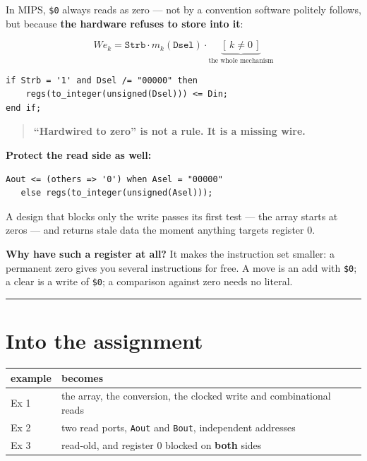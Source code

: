 \documentclass[11pt]{article}
\newcommand{\code}[1]{\texttt{#1}}
\newcommand{\hr}{\vspace{2pt}\hrule\vspace{6pt}}
\begin{document}
In MIPS, \code{\$0} always reads as zero --- not by a convention software politely
follows, but because \textbf{the hardware refuses to store into it}:

\[
\mathit{We}_k = \code{Strb} \cdot m_k(\code{Dsel}) \cdot \underbrace{[\,k \neq 0\,]}_{\text{the whole mechanism}}
\]

\begin{lstlisting}
if Strb = '1' and Dsel /= "00000" then
    regs(to_integer(unsigned(Dsel))) <= Din;
end if;
\end{lstlisting}

\begin{quote}
\textbf{``Hardwired to zero'' is not a rule. It is a missing wire.}
\end{quote}

\textbf{Protect the read side as well:}

\begin{lstlisting}
Aout <= (others => '0') when Asel = "00000"
   else regs(to_integer(unsigned(Asel)));
\end{lstlisting}

A design that blocks only the write passes its first test --- the array starts at
zeros --- and returns stale data the moment anything targets register 0.

\textbf{Why have such a register at all?} It makes the instruction set smaller: a
permanent zero gives you several instructions for free. A move is an add with
\code{\$0}; a clear is a write of \code{\$0}; a comparison against zero needs no
literal.

\vspace{4pt}\hr

\section*{Into the assignment}

\begin{center}
\begin{tabular}{ll}
\toprule
example & becomes \\
\midrule
Ex 1 & the array, the conversion, the clocked write and combinational reads \\
Ex 2 & two read ports, \code{Aout} and \code{Bout}, independent addresses \\
Ex 3 & read-old, and register 0 blocked on \textbf{both} sides \\
\bottomrule
\end{tabular}
\end{center}
\end{document}
